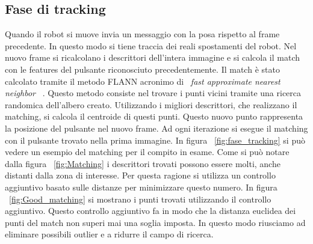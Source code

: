 \subsection{Fase di tracking}
Quando il robot si muove invia un messaggio con la posa rispetto al frame precedente. In questo modo si tiene traccia dei reali spostamenti del robot. Nel nuovo frame si ricalcolano i descrittori dell'intera immagine e si calcola il match con le features del pulsante riconosciuto precedentemente. Il match è stato calcolato tramite il metodo FLANN acronimo di ~\emph{fast approximate nearest neighbor} ~\cite{FLANN}. Questo metodo consiste nel trovare i punti vicini tramite una ricerca randomica dell'albero creato. Utilizzando i migliori descrittori, che realizzano il matching, si calcola il centroide di questi punti. Questo nuovo punto rappresenta la posizione del pulsante nel nuovo frame. Ad ogni iterazione si esegue il matching con il pulsante trovato nella prima immagine.
In figura ~\ref{fig:fase_tracking} si può vedere un esempio del matching per il compito in esame. Come si può notare dalla figura ~\ref{fig:Matching} i descrittori trovati possono essere molti, anche distanti dalla zona di interesse. Per questa ragione si utilizza un controllo aggiuntivo basato sulle distanze per minimizzare questo numero. In figura ~\ref{fig:Good_matching} si mostrano i punti trovati utilizzando il controllo aggiuntivo. Questo controllo aggiuntivo fa in modo che la distanza euclidea dei punti del match non superi mai una soglia imposta. In questo modo riusciamo ad eliminare possibili outlier e a ridurre il campo di ricerca.     
